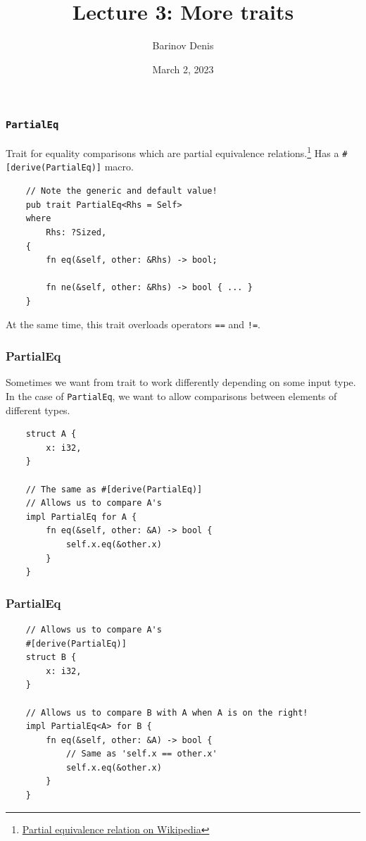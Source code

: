 \documentclass[aspectratio=1610,t]{beamer}
\title{Lecture 3: More traits}
\date{March 2, 2023}
\author{Barinov Denis}
\institute{barinov.diu@gmail.com}
\begin{document}

\begin{frame}
\maketitle
\end{frame}


\begin{frame}[fragile]
\frametitle{\texttt{PartialEq}}
Trait for equality comparisons which are partial equivalence relations.\footnote{\href{https://en.wikipedia.org/wiki/Partial_equivalence_relation}{Partial equivalence relation on Wikipedia}} Has a \texttt{\#[derive(PartialEq)]} macro.

\begin{verbatim}
    // Note the generic and default value!
    pub trait PartialEq<Rhs = Self>
    where
        Rhs: ?Sized,
    {
        fn eq(&self, other: &Rhs) -> bool;

        fn ne(&self, other: &Rhs) -> bool { ... }
    }
\end{verbatim}

At the same time, this trait overloads operators \texttt{==} and \texttt{!=}.
\end{frame}


\begin{frame}[fragile]
\frametitle{PartialEq}
Sometimes we want from trait to work differently depending on some input type. In the case of \texttt{PartialEq}, we want to allow comparisons between elements of different types.

\begin{verbatim}
    struct A {
        x: i32,
    }

    // The same as #[derive(PartialEq)]
    // Allows us to compare A's
    impl PartialEq for A {
        fn eq(&self, other: &A) -> bool {
            self.x.eq(&other.x)
        }
    }
\end{verbatim}
\end{frame}


\begin{frame}[fragile]
\frametitle{PartialEq}
\begin{verbatim}
    // Allows us to compare A's
    #[derive(PartialEq)]
    struct B {
        x: i32,
    }

    // Allows us to compare B with A when A is on the right!
    impl PartialEq<A> for B {
        fn eq(&self, other: &A) -> bool {
            // Same as 'self.x == other.x'
            self.x.eq(&other.x)
        }
    }
\end{verbatim}
\end{frame}
\end{document}
